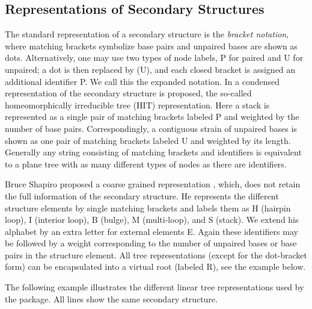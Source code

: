 \subsection*{Representations of Secondary Structures}

The standard representation of a secondary structure is the {\itshape bracket notation}, where matching brackets symbolize base pairs and unpaired bases are shown as dots. Alternatively, one may use two types of node labels, \textquotesingle{}P\textquotesingle{} for paired and \textquotesingle{}U\textquotesingle{} for unpaired; a dot is then replaced by \textquotesingle{}(U)\textquotesingle{}, and each closed bracket is assigned an additional identifier \textquotesingle{}P\textquotesingle{}. We call this the expanded notation. In \cite{fontana:1993b} a condensed representation of the secondary structure is proposed, the so-\/called homeomorphically irreducible tree (H\+IT) representation. Here a stack is represented as a single pair of matching brackets labeled \textquotesingle{}P\textquotesingle{} and weighted by the number of base pairs. Correspondingly, a contiguous strain of unpaired bases is shown as one pair of matching brackets labeled \textquotesingle{}U\textquotesingle{} and weighted by its length. Generally any string consisting of matching brackets and identifiers is equivalent to a plane tree with as many different types of nodes as there are identifiers.

Bruce Shapiro proposed a coarse grained representation \cite{shapiro:1988}, which, does not retain the full information of the secondary structure. He represents the different structure elements by single matching brackets and labels them as \textquotesingle{}H\textquotesingle{} (hairpin loop), \textquotesingle{}I\textquotesingle{} (interior loop), \textquotesingle{}B\textquotesingle{} (bulge), \textquotesingle{}M\textquotesingle{} (multi-\/loop), and \textquotesingle{}S\textquotesingle{} (stack). We extend his alphabet by an extra letter for external elements \textquotesingle{}E\textquotesingle{}. Again these identifiers may be followed by a weight corresponding to the number of unpaired bases or base pairs in the structure element. All tree representations (except for the dot-\/bracket form) can be encapsulated into a virtual root (labeled \textquotesingle{}R\textquotesingle{}), see the example below.

The following example illustrates the different linear tree representations used by the package. All lines show the same secondary structure.

